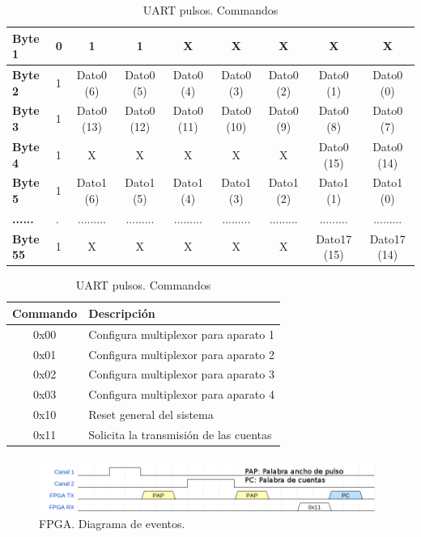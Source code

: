 \begin{table}[h]
\begin{tabularx}{\textwidth}{|l|X|c|c|c|c|c|c|c|}
				\cellcolor[HTML]{C0C0C0}\textbf{Byte 1}  & 0 & 1           & 1  	& X	      & X	    & X	  	 & X	       & X	     	\\ \hline
				\cellcolor[HTML]{C0C0C0}\textbf{Byte 2}  & 1 & Dato0 (6)   & Dato0 (5) 	& Dato0 (4)   & Dato0 (3)   & Dato0 (2)  & Dato0 (1)   & Dato0 (0)  	\\ \hline
				\cellcolor[HTML]{C0C0C0}\textbf{Byte 3}  & 1 & Dato0 (13)  & Dato0 (12)	& Dato0 (11)  & Dato0 (10)  & Dato0 (9)  & Dato0 (8)   & Dato0 (7)  	\\ \hline
				\cellcolor[HTML]{C0C0C0}\textbf{Byte 4}  & 1 & X	   & X	 	& X	      & X	    & X		 & Dato0 (15)  & Dato0 (14)	\\ \hline
				\cellcolor[HTML]{C0C0C0}\textbf{Byte 5}  & 1 & Dato1 (6)   & Dato1 (5) 	& Dato1 (4)   & Dato1 (3)   & Dato1 (2)  & Dato1 (1)   & Dato1 (0)  	\\ \hline
				\cellcolor[HTML]{C0C0C0}\textbf{......}  & . & .........   & ......... 	& .........   & .........   & .........  & .........   & .........  	\\ \hline
				\cellcolor[HTML]{C0C0C0}\textbf{Byte 55} & 1 & X	   & X	 	& X	      & X	    & X		 & Dato17 (15) & Dato17 (14)	\\ \hline
			\end{tabularx}
			\caption{UART pulsos. Palabra de cuentas}
			\label{tab:FPGAUartCont}
			\begin{tabularx}{\hsize}{|c|X|}
		  		\hline
				\rowcolor[HTML]{C0C0C0} 
		  		Commando & Descripción                            \\\hline
		  		0x00     & Configura multiplexor para aparato 1   \\\hline
		  		0x01     & Configura multiplexor para aparato 2   \\\hline
		  		0x02     & Configura multiplexor para aparato 3   \\\hline
		  		0x03     & Configura multiplexor para aparato 4   \\\hline
		  		0x10     & Reset general del sistema              \\\hline
		  		0x11     & Solicita la transmisión de las cuentas \\\hline
			\end{tabularx}
			\caption{UART pulsos. Commandos}
			\label{tab:FPGAUartComm}
		\end{table}
		\begin{figure}[h]
			\centering
			\includegraphics[keepaspectratio, width=1\textwidth]{./img/fpgawave.png}
			\caption{FPGA. Diagrama de eventos.}
			\label{fig:fpgaWave}
		\end{figure}
